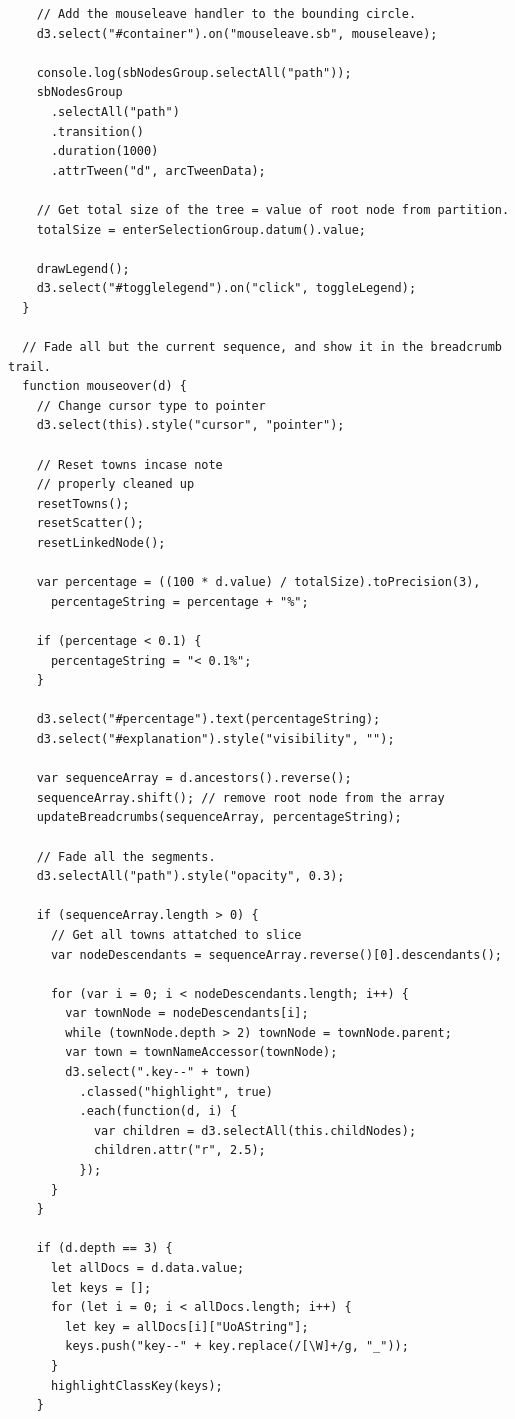 \documentclass[a4paper, 11pt]{article}
\begin{document}
\begin{verbatim}
    // Add the mouseleave handler to the bounding circle.
    d3.select("#container").on("mouseleave.sb", mouseleave);

    console.log(sbNodesGroup.selectAll("path"));
    sbNodesGroup
      .selectAll("path")
      .transition()
      .duration(1000)
      .attrTween("d", arcTweenData);

    // Get total size of the tree = value of root node from partition.
    totalSize = enterSelectionGroup.datum().value;

    drawLegend();
    d3.select("#togglelegend").on("click", toggleLegend);
  }

  // Fade all but the current sequence, and show it in the breadcrumb trail.
  function mouseover(d) {
    // Change cursor type to pointer
    d3.select(this).style("cursor", "pointer");

    // Reset towns incase note
    // properly cleaned up
    resetTowns();
    resetScatter();
    resetLinkedNode();

    var percentage = ((100 * d.value) / totalSize).toPrecision(3),
      percentageString = percentage + "%";

    if (percentage < 0.1) {
      percentageString = "< 0.1%";
    }

    d3.select("#percentage").text(percentageString);
    d3.select("#explanation").style("visibility", "");

    var sequenceArray = d.ancestors().reverse();
    sequenceArray.shift(); // remove root node from the array
    updateBreadcrumbs(sequenceArray, percentageString);

    // Fade all the segments.
    d3.selectAll("path").style("opacity", 0.3);

    if (sequenceArray.length > 0) {
      // Get all towns attatched to slice
      var nodeDescendants = sequenceArray.reverse()[0].descendants();

      for (var i = 0; i < nodeDescendants.length; i++) {
        var townNode = nodeDescendants[i];
        while (townNode.depth > 2) townNode = townNode.parent;
        var town = townNameAccessor(townNode);
        d3.select(".key--" + town)
          .classed("highlight", true)
          .each(function(d, i) {
            var children = d3.selectAll(this.childNodes);
            children.attr("r", 2.5);
          });
      }
    }

    if (d.depth == 3) {
      let allDocs = d.data.value;
      let keys = [];
      for (let i = 0; i < allDocs.length; i++) {
        let key = allDocs[i]["UoAString"];
        keys.push("key--" + key.replace(/[\W]+/g, "_"));
      }
      highlightClassKey(keys);
    }


\end{verbatim}
\end{document}
